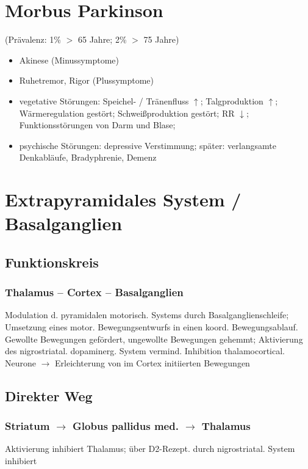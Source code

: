 \documentclass[10pt,a4paper]{report}
\begin{document}
\section{Morbus Parkinson} %
\label{sec:morbus_parkinson}
(Prävalenz: 1\% $>$ 65 Jahre; 2\% $>$ 75 Jahre)
\begin{itemize}
	\item Akinese (Minussymptome)
	\item  Ruhetremor, Rigor (Plussymptome)
	\item vegetative Störungen: Speichel- / Tränenfluss $\uparrow$; Talgproduktion $\uparrow$; Wärmeregulation gestört; Schweißproduktion gestört; RR $\downarrow$; Funktionsstörungen von Darm und Blase; 
	\item psychische Störungen: depressive Verstimmung; später: verlangsamte Denkabläufe, Bradyphrenie, Demenz
\end{itemize}
\section{Extrapyramidales System / Basalganglien} %
\label{sec:extrapyramidales_system_basalganglien}
\subsection{Funktionskreis} %
\label{sub:funktionskreis}
\subsubsection{Thalamus – Cortex – Basalganglien} %
\label{ssub:subsubsection_name}
Modulation d. pyramidalen motorisch. Systems durch Basalganglienschleife; 
Umsetzung eines motor. Bewegungsentwurfs in einen koord. Bewegungsablauf. Gewollte Bewegungen gefördert, ungewollte Bewegungen gehemmt; 
Aktivierung des nigrostriatal. dopaminerg. System vermind. Inhibition thalamocortical. Neurone $\rightarrow$ Erleichterung von im Cortex initiierten Bewegungen 
\subsection{Direkter Weg} %
\label{sub:ditekter_weg}
\subsubsection{Striatum $\rightarrow$ Globus pallidus med. $\rightarrow$ Thalamus } %
\label{ssub:subsubsection_name}
Aktivierung inhibiert Thalamus; über D2-Rezept. durch nigrostriatal. System inhibiert
\end{document}
